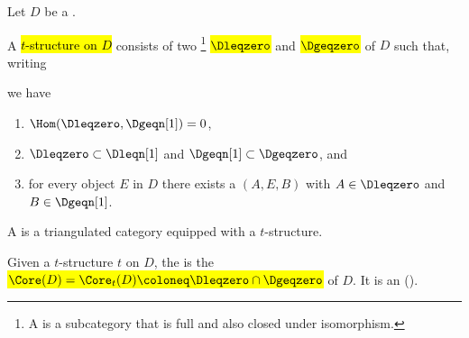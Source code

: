 \begin{definition} \label{definition:t_structure_on_a_triangulated_category}
    Let $D$ be a .

A \hl{$t$-structure on $D$} consists of two 
\footnote{A  is a subcategory that is full and also closed under isomorphism.}
\hl{$\Dleqzero$} and \hl{$\Dgeqzero$} of $D$ such that, writing

\hlalign{
\begin{align*}
    \Dleqn &= \Dleqzero[-n] \\ 
    \Dgeqn &= \Dgeqzero[-n]
\end{align*}
}

we have 
\begin{enumerate}
    \item $\Hom(\Dleqzero, \Dgeqn[1]) = 0$,
    \item $\Dleqzero \subset \Dleqn[1]$ and $\Dgeqn[1] \subset \Dgeqzero$, and \label{item:inclusions_of_t_structure_categories}
    \item for every object $E$ in $D$ there exists a  $(A,E,B)$ with $A \in \Dleqzero$ and $B \in \Dgeqn[1]$. 
\end{enumerate}

A  is a triangulated category equipped with a $t$-structure.

Given a $t$-structure $t$ on $D$, the  is the  \hl{$\Core(D) = \Core_t(D) \coloneq \Dleqzero \cap \Dgeqzero$}  of $D$. It is an  ().
\end{definition}